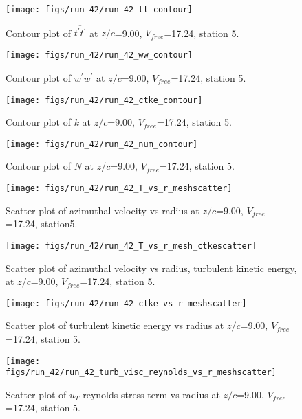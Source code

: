 \begin{figure}[H]
\centering
\texttt{[image: figs/run\_42/run\_42\_tt\_contour]}
\caption{Contour plot of $\overline{t^\prime t^\prime}$ at $z/c$=9.00, $V_{free}$=17.24, station 5.}
\end{figure}


\begin{figure}[H]
\centering
\texttt{[image: figs/run\_42/run\_42\_ww\_contour]}
\caption{Contour plot of $\overline{w^\prime w^\prime}$ at $z/c$=9.00, $V_{free}$=17.24, station 5.}
\end{figure}


\begin{figure}[H]
\centering
\texttt{[image: figs/run\_42/run\_42\_ctke\_contour]}
\caption{Contour plot of $k$ at $z/c$=9.00, $V_{free}$=17.24, station 5.}
\end{figure}


\begin{figure}[H]
\centering
\texttt{[image: figs/run\_42/run\_42\_num\_contour]}
\caption{Contour plot of $N$ at $z/c$=9.00, $V_{free}$=17.24, station 5.}
\end{figure}


\begin{figure}[H]
\centering
\texttt{[image: figs/run\_42/run\_42\_T\_vs\_r\_meshscatter]}
\caption{Scatter plot of azimuthal velocity vs radius at $z/c$=9.00, $V_{free}$=17.24, station5.}
\end{figure}


\begin{figure}[H]
\centering
\texttt{[image: figs/run\_42/run\_42\_T\_vs\_r\_mesh\_ctkescatter]}
\caption{Scatter plot of azimuthal velocity vs radius, turbulent kinetic energy, at $z/c$=9.00, $V_{free}$=17.24, station 5.}
\end{figure}


\begin{figure}[H]
\centering
\texttt{[image: figs/run\_42/run\_42\_ctke\_vs\_r\_meshscatter]}
\caption{Scatter plot of turbulent kinetic energy vs radius at $z/c$=9.00, $V_{free}$=17.24, station 5.}
\end{figure}


\begin{figure}[H]
\centering
\texttt{[image: figs/run\_42/run\_42\_turb\_visc\_reynolds\_vs\_r\_meshscatter]}
\caption{Scatter plot of $
u_T$ reynolds stress term vs radius at $z/c$=9.00, $V_{free}$=17.24, station 5.}
\end{figure}



